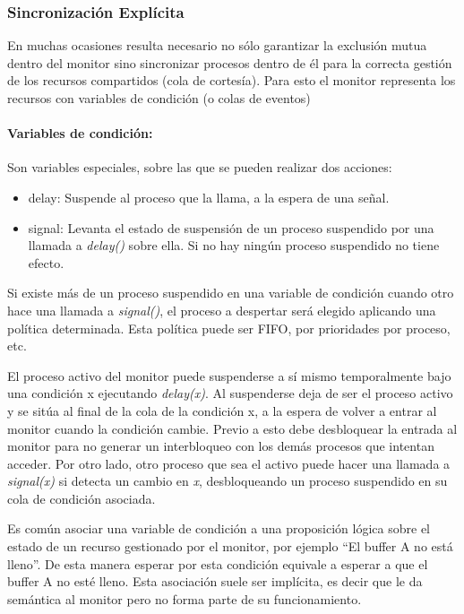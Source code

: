 \subsubsection{Sincronización Explícita}

En muchas ocasiones resulta necesario no sólo garantizar la exclusión mutua
dentro del monitor sino sincronizar procesos dentro de él para la correcta
gestión de los recursos compartidos (cola de cortesía). Para esto el monitor
representa los recursos con variables de condición (o colas de eventos)

\begin{framed}
\paragraph{Variables de condición:} Son variables especiales, sobre las que se
pueden realizar dos acciones:
\begin{itemize}
    \item delay: Suspende al proceso que la llama, a la espera de una señal.
    \item signal: Levanta el estado de suspensión de un proceso suspendido por
    una llamada a \textit{delay()} sobre ella. Si no hay ningún proceso
    suspendido no tiene efecto.
\end{itemize}
Si existe más de un proceso suspendido en una
variable de condición cuando otro hace una llamada a \textit{signal()}, el
proceso a despertar será elegido aplicando una política determinada. Esta
política puede ser FIFO, por prioridades por proceso, etc.
\end{framed}

El proceso activo del monitor puede suspenderse a sí mismo temporalmente bajo
una condición x ejecutando \textit{delay(x)}. Al suspenderse deja de ser el
proceso activo y se sitúa al final de la cola de la condición x, a la espera de
volver a entrar al monitor cuando la condición cambie. Previo a esto debe
desbloquear la entrada al monitor para no generar un interbloqueo con los demás
procesos que intentan acceder. Por otro lado, otro proceso que sea el activo
puede hacer una llamada a \textit{signal(x)} si detecta un cambio en \textit{x},
desbloqueando un proceso suspendido en su cola de condición asociada.

Es común asociar una variable de condición a una proposición lógica sobre el
estado de un recurso gestionado por el monitor, por ejemplo “El buffer A no
está lleno”. De esta manera esperar por esta condición equivale a esperar a que
el buffer A no esté lleno. Esta asociación suele ser implícita, es decir que le
da semántica al monitor pero no forma parte de su funcionamiento.

